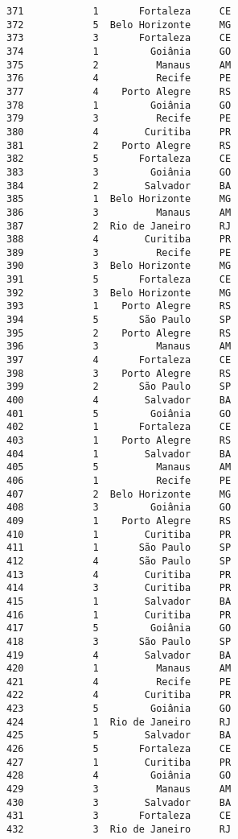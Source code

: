 \documentclass[11pt]{article}
\begin{document}
\begin{Verbatim}[commandchars=\\\{\}]
371            1       Fortaleza     CE  
372            5  Belo Horizonte     MG  
373            3       Fortaleza     CE  
374            1         Goiânia     GO  
375            2          Manaus     AM  
376            4          Recife     PE  
377            4    Porto Alegre     RS  
378            1         Goiânia     GO  
379            3          Recife     PE  
380            4        Curitiba     PR  
381            2    Porto Alegre     RS  
382            5       Fortaleza     CE  
383            3         Goiânia     GO  
384            2        Salvador     BA  
385            1  Belo Horizonte     MG  
386            3          Manaus     AM  
387            2  Rio de Janeiro     RJ  
388            4        Curitiba     PR  
389            3          Recife     PE  
390            3  Belo Horizonte     MG  
391            5       Fortaleza     CE  
392            3  Belo Horizonte     MG  
393            1    Porto Alegre     RS  
394            5       São Paulo     SP  
395            2    Porto Alegre     RS  
396            3          Manaus     AM  
397            4       Fortaleza     CE  
398            3    Porto Alegre     RS  
399            2       São Paulo     SP  
400            4        Salvador     BA  
401            5         Goiânia     GO  
402            1       Fortaleza     CE  
403            1    Porto Alegre     RS  
404            1        Salvador     BA  
405            5          Manaus     AM  
406            1          Recife     PE  
407            2  Belo Horizonte     MG  
408            3         Goiânia     GO  
409            1    Porto Alegre     RS  
410            1        Curitiba     PR  
411            1       São Paulo     SP  
412            4       São Paulo     SP  
413            4        Curitiba     PR  
414            3        Curitiba     PR  
415            1        Salvador     BA  
416            1        Curitiba     PR  
417            5         Goiânia     GO  
418            3       São Paulo     SP  
419            4        Salvador     BA  
420            1          Manaus     AM  
421            4          Recife     PE  
422            4        Curitiba     PR  
423            5         Goiânia     GO  
424            1  Rio de Janeiro     RJ  
425            5        Salvador     BA  
426            5       Fortaleza     CE  
427            1        Curitiba     PR  
428            4         Goiânia     GO  
429            3          Manaus     AM  
430            3        Salvador     BA  
431            3       Fortaleza     CE  
432            3  Rio de Janeiro     RJ  

\end{Verbatim}
\end{document}
